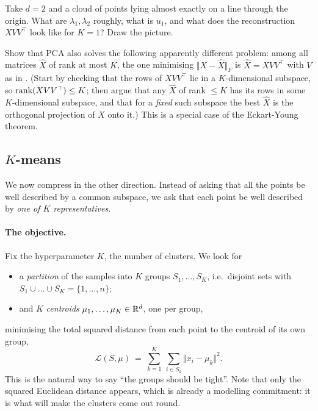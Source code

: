 \begin{exercise}[$\star$]
Take $d = 2$ and a cloud of points lying almost exactly on a line through the origin.
What are $\lambda_1, \lambda_2$ roughly, what is $u_1$, and what does the reconstruction
$X V V^\top$ look like for $K = 1$? Draw the picture.
\end{exercise}

\begin{exercise}[$\star\star$]
Show that PCA also solves the following apparently different problem: among all
matrices $\hat X$ of rank at most $K$, the one minimising $\Vert X - \hat X\Vert_F$ is
$\hat X = X V V^\top$ with $V$ as in . (Start by checking that the rows of
$X V V^\top$ lie in a $K$-dimensional subspace, so $\operatorname{rank}(XVV^\top) \le K$; then argue
that any $\hat X$ of rank $\leq K$ has its rows in some $K$-dimensional subspace, and
that for a \emph{fixed} such subspace the best $\hat X$ is the orthogonal projection of
$X$ onto it.) This is a special case of the Eckart-Young theorem.
\end{exercise}


\subsection{$K$-means}
\label{subsec:kmeans}

We now compress in the other direction. Instead of asking that all the points be well
described by a common subspace, we ask that each point be well described by \emph{one
of $K$ representatives}.

\paragraph{The objective.}
Fix the hyperparameter $K$, the number of clusters. We look for
\begin{itemize}
    \item a \emph{partition} of the samples into $K$ groups $S_1, \dots, S_K$, i.e.\
    disjoint sets with $S_1 \cup \dots \cup S_K = \{1, \dots, n\}$;
    \item and $K$ \emph{centroids} $\mu_1, \dots, \mu_K \in \mathbb{R}^d$, one per group,
\end{itemize}
minimising the total squared distance from each point to the centroid of its own group,
\[
\mathcal{L}(S, \mu) \ = \ \sum_{k=1}^K \ \sum_{i \in S_k} \big\Vert x_i - \mu_k \big\Vert^2 .
\]
This is the natural way to say ``the groups should be tight''. Note that only the
squared Euclidean distance appears, which is already a modelling commitment: it is what
will make the clusters come out round.


